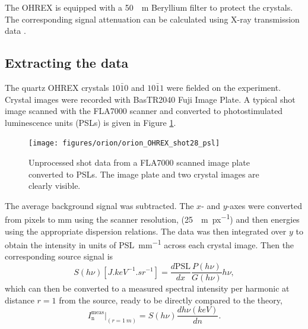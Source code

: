The OHREX is equipped with a \qty{50}{\mu m} Beryllium filter to protect the crystals. The corresponding signal attenuation can be calculated using X-ray transmission data \cite{henkeXRayInteractionsPhotoabsorption1993}.

\subsection{Extracting the data}
The quartz OHREX crystals $10\bar{1}0$ and $10\bar{1}1$ were fielded on the experiment. Crystal images were recorded with BasTR2040 Fuji Image Plate. A typical shot image scanned with the FLA7000 scanner and converted to photostimulated luminescence units (PSLs) is given in Figure \ref{fig:orionohrexshot28psl}.

\begin{figure}
	\centering
	\texttt{[image: figures/orion/orion\_OHREX\_shot28\_psl]}
	\caption[Unprocessed IP from ORION experiment]{Unprocessed shot data from a FLA7000 scanned image plate converted to PSLs. The image plate and two crystal images are clearly visible.}
	\label{fig:orionohrexshot28psl}
\end{figure}
The average background signal was subtracted. The $x$- and $y$-axes were converted from pixels to mm using the scanner resolution, (\qty{25}{\mu m.px^{-1}}) and then energies using the appropriate dispersion relations. The data was then integrated over $y$ to obtain the intensity in units of \unit{PSL.mm^{-1}} across each crystal image. Then the corresponding source signal is
\begin{equation}
	S(h\nu)[\unit{J.keV^{-1}.sr^{-1}}] = \frac{d\mathrm{PSL}}{dx}\frac{P(h\nu)}{G(h\nu)}h\nu,
\end{equation}
which can then be converted to a measured spectral intensity per harmonic at distance $r=1$ from the source, ready to be directly compared to the theory,
\begin{equation}
	I^\mathrm{meas}_\mathrm{n}|_{(r = \qty{1}{m})} = S(h\nu)\frac{dh\nu(keV)}{dn}.
\end{equation}


